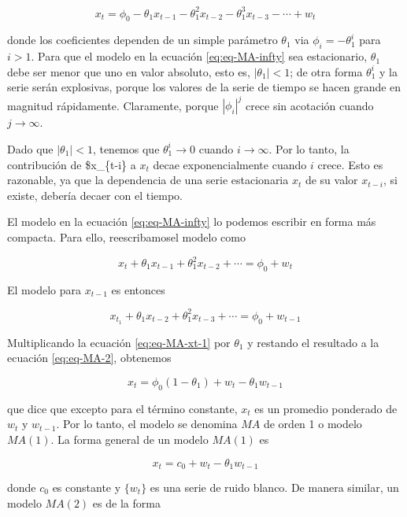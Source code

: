 \documentclass[12pt,]{krantz}
\theoremstyle{definition}
\theoremstyle{definition}
\theoremstyle{definition}
\theoremstyle{remark}
\begin{document}
\begin{equation}
x_t=\phi_0-\theta_1x_{t-1}-\theta_1^2x_{t-2}-\theta_1^3x_{t-3}-\cdots+w_t
\label{eq:eq-MA-infty}
\end{equation}

donde los coeficientes dependen de un simple parámetro \(\theta_1\) via
\(\phi_i=-\theta_1^i\) para \(i>1\). Para que el modelo en la ecuación
\eqref{eq:eq-MA-infty} sea estacionario, \(\theta_1\) debe ser menor que
uno en valor absoluto, esto es, \(|\theta_1|<1\); de otra forma
\(\theta_1^i\) y la serie serán explosivas, porque los valores de la
serie de tiempo se hacen grande en magnitud rápidamente. Claramente,
porque \(|\phi_i|^j\) crece sin acotación cuando \(j\to\infty\).

Dado que \(|\theta_1|<1\), tenemos que \(\theta_1^i\to0\) cuando
\(i\to\infty\). Por lo tanto, la contribución de \$x\_\{t-i\} a \(x_t\)
decae exponencialmente cuando \(i\) crece. Esto es razonable, ya que la
dependencia de una serie estacionaria \(x_t\) de su valor \(x_{t-i}\),
si existe, debería decaer con el tiempo.

El modelo en la ecuación \eqref{eq:eq-MA-infty} lo podemos escribir en
forma más compacta. Para ello, reescribamosel modelo como

\begin{equation}
x_t+\theta_1x_{t-1}+\theta_1^2x_{t-2}+\cdots=\phi_0+w_t
\label{eq:eq-MA-2}
\end{equation}

El modelo para \(x_{t-1}\) es entonces

\begin{equation}
x_{t_1}+\theta_1x_{t-2}+\theta_1^2x_{t-3}+\cdots=\phi_0+w_{t-1}
\label{eq:eq-MA-xt-1}
\end{equation}

Multiplicando la ecuación \eqref{eq:eq-MA-xt-1} por \(\theta_1\) y
restando el resultado a la ecuación \eqref{eq:eq-MA-2}, obtenemos

\[x_t=\phi_0(1-\theta_1)+w_t-\theta_1w_{t-1}\]

que dice que excepto para el término constante, \(x_t\) es un promedio
ponderado de \(w_t\) y \(w_{t-1}\). Por lo tanto, el modelo se denomina
\(MA\) de orden 1 o modelo \(MA(1)\). La forma general de un modelo
\(MA(1)\) es

\begin{equation}
x_t=c_0+w_t-\theta_1w_{t-1}
\label{eq:eq-MA1}
\end{equation}

donde \(c_0\) es constante y \(\{w_t\}\) es una serie de ruido blanco.
De manera similar, un modelo \(MA(2)\) es de la forma
\end{document}
